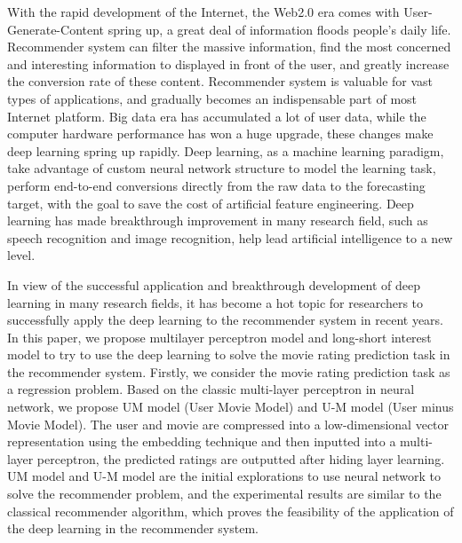 \begin{eabstract}
With the rapid development of the Internet, the Web2.0 era comes with User-Generate-Content spring up,
a great deal of information floods people's daily life.
Recommender system can filter the massive information, 
find the most concerned and interesting information to displayed in front of the user,
and greatly increase the conversion rate of these content.
Recommender system is valuable for vast types of applications,
and gradually becomes an indispensable part of most Internet platform.
Big data era has accumulated a lot of user data, while the computer hardware performance has
won a huge upgrade, these changes make deep learning spring up rapidly.
Deep learning, as a machine learning paradigm, take advantage of custom neural network structure
to model the learning task, perform end-to-end conversions directly from the raw data
to the forecasting target, with the goal to save the cost of artificial feature engineering.
Deep learning has made breakthrough improvement in many research field, such as speech recognition
and image recognition, help lead artificial intelligence to a new level.

In view of the successful application and breakthrough development of deep learning in many research fields,
it has become a hot topic for researchers to successfully apply the deep learning to the recommender system in recent years.
In this paper, we propose multilayer perceptron model and long-short interest model to
try to use the deep learning to solve the movie rating prediction task in the recommender system.
Firstly, we consider the movie rating prediction task as a regression problem.
Based on the classic multi-layer perceptron in neural network,
we propose UM model (User Movie Model) and U-M model (User minus Movie Model).
The user and movie are compressed into a low-dimensional vector representation using the embedding technique and
then inputted into a multi-layer perceptron, the predicted ratings are outputted after hiding layer learning.
UM model and U-M model are the initial explorations to use neural network to solve the recommender problem,
and the experimental results are similar to the classical recommender algorithm,
which proves the feasibility of the application of the deep learning in the recommender system.


\end{eabstract}
